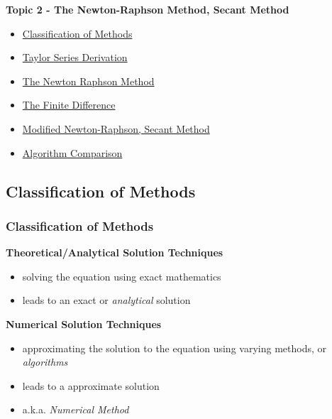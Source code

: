 \documentclass[fleqn]{beamer} %
\newcommand{\sectionIItitle}{The Newton-Raphson Method, Secant Method}
\newcommand{\sectionIIsubsectionItitle}{Classification of Methods}
\newcommand{\sectionIIsubsectionIItitle}{Taylor Series Derivation}
\newcommand{\sectionIIsubsectionIIItitle}{The Newton Raphson Method}
\newcommand{\sectionIIsubsectionIVtitle}{The Finite Difference}
\newcommand{\sectionIIsubsectionVtitle}{Modified Newton-Raphson, Secant Method}
\newcommand{\sectionIIsubsectionVItitle}{Algorithm Comparison}
\begin{document}
		\begin{frame}
			\large \textbf{Topic 2 - \sectionIItitle} \vspace{3mm}\\

			\begin{itemize}
				\item \hyperlink{sectionIIsubsectionI}{\sectionIIsubsectionItitle} \vspc %
				\item \hyperlink{sectionIIsubsectionII}{\sectionIIsubsectionIItitle} \vspc %
				\item \hyperlink{sectionIIsubsectionIII}{\sectionIIsubsectionIIItitle} \vspc %
				\item \hyperlink{sectionIIsubsectionIV}{\sectionIIsubsectionIVtitle} \vspc %
				\item \hyperlink{sectionIIsubsectionV}{\sectionIIsubsectionVtitle} \vspc %
				\item \hyperlink{sectionIIsubsectionVI}{\sectionIIsubsectionVItitle} \vspc %
			\end{itemize}

		\end{frame}

		\subsection{\sectionIIsubsectionItitle}\label{sectionIIsubsectionI}

			\begin{frame}[label=sectionIIsubsectionI]
				\frametitle{\sectionIIsubsectionItitle}
				\bigskip

				\vspace{5mm}  	
				\textbf{ Theoretical/Analytical Solution Techniques }
				\begin{itemize}
					\item solving the equation using exact mathematics \\
					\item leads to an exact or {\it analytical} solution \\ 	\vspace{10mm}
				\end{itemize}
				\textbf{ Numerical Solution Techniques }		
				\begin{itemize}
					\item  approximating the solution to the equation using varying methods, or {\it algorithms}  \\
					\item leads to a approximate solution \\ 
					\item a.k.a. {\it Numerical Method}\vspace{20mm}
				\end{itemize}

				\btVFill
			\end{frame}
\end{document}
